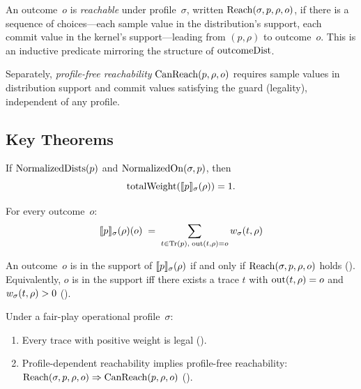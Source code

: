 \documentclass[11pt]{article}
\begin{document}
\begin{definition}[Reachability]\label{def:reach}
An outcome~$o$ is \emph{reachable} under profile~$\sigma$, written
$\mathrm{Reach}(\sigma, p, \rho, o)$, if there is a sequence of choices---each
sample value in the distribution's support, each commit value in the
kernel's support---leading from $(p, \rho)$ to outcome~$o$. This is
an inductive predicate mirroring the structure of $\mathrm{outcomeDist}$.

Separately, \emph{profile-free reachability} $\mathrm{CanReach}(p, \rho, o)$ requires
sample values in distribution support and commit values satisfying the guard
(legality), independent of any profile.
\end{definition}


\subsection{Key Theorems}\label{sec:theorems}

\begin{theorem}[Normalization]\label{thm:norm}
If $\mathrm{NormalizedDists}(p)$ and $\mathrm{NormalizedOn}(\sigma, p)$, then
\[
  \mathrm{totalWeight}(\llbracket p \rrbracket_{\sigma}(\rho)) = 1.
\]
\end{theorem}

\begin{theorem}[Adequacy]\label{thm:adequacy}
For every outcome~$o$:
\[
  \llbracket p \rrbracket_{\sigma}(\rho)(o) \;=\;
  \sum_{t \in \mathrm{Tr}(p),\;\mathrm{out}(t,\rho)=o} w_{\sigma}(t, \rho)
\]
\end{theorem}

\begin{theorem}\label{thm:support}
An outcome~$o$ is in the support of $\llbracket p \rrbracket_{\sigma}(\rho)$ if and only if
$\mathrm{Reach}(\sigma, p, \rho, o)$ holds
(). Equivalently, $o$ is in the
support iff there exists a trace $t$ with $\mathrm{out}(t,\rho) = o$ and
$w_{\sigma}(t,\rho) > 0$
().
\end{theorem}

\begin{theorem}\label{thm:fairplay}
Under a fair-play operational profile~$\sigma$:
\begin{enumerate}[nosep]
\item Every trace with positive weight is legal
      ().
\item Profile-dependent reachability implies profile-free reachability:
      $\mathrm{Reach}(\sigma, p, \rho, o) \Rightarrow \mathrm{CanReach}(p, \rho, o)$
      ().
\end{enumerate}
\end{theorem}
\end{document}

